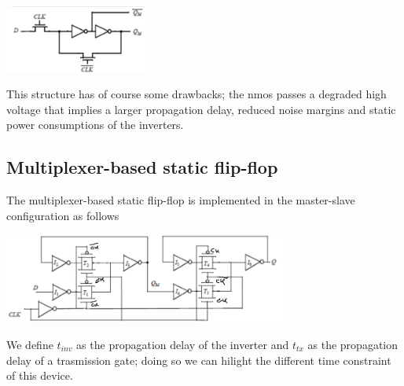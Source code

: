 \centering
\includegraphics[width=0.35\textwidth]{C10_10.png}\\
\raggedright

This structure has of course some drawbacks; the nmos passes a degraded high voltage that implies a larger propagation delay, reduced noise margins and static power consumptions of the inverters.\\


\subsection{Multiplexer-based static flip-flop}

The multiplexer-based static flip-flop is implemented in the master-slave configuration as follows

\centering
\includegraphics[width=0.7\textwidth]{C10_11.png}\\
\raggedright

We define $t_{inv}$ as the propagation delay of the inverter and $t_{tx}$ as the propagation delay of a trasmission gate; doing so we can hilight the different time constraint of this device.\\

